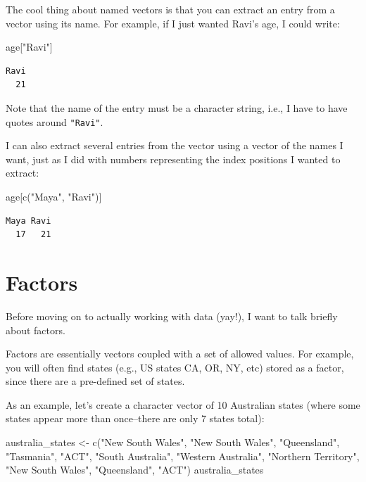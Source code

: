 \documentclass[
  letterpaper,
  DIV=11,
  numbers=noendperiod]{scrreprt}
\newenvironment{Shaded}{\begin{snugshade}}{\end{snugshade}}
\newcommand{\FunctionTok}[1]{\textcolor[rgb]{0.28,0.35,0.67}{#1}}
\newcommand{\NormalTok}[1]{\textcolor[rgb]{0.00,0.23,0.31}{#1}}
\newcommand{\OtherTok}[1]{\textcolor[rgb]{0.00,0.23,0.31}{#1}}
\newcommand{\StringTok}[1]{\textcolor[rgb]{0.13,0.47,0.30}{#1}}
\begin{document}
The cool thing about named vectors is that you can extract an entry from
a vector using its name. For example, if I just wanted Ravi's age, I
could write:

\begin{Shaded}
\begin{Highlighting}[]
\NormalTok{age[}\StringTok{"Ravi"}\NormalTok{]}
\end{Highlighting}
\end{Shaded}

\begin{verbatim}
Ravi 
  21 
\end{verbatim}

Note that the name of the entry must be a character string, i.e., I have
to have quotes around \texttt{"Ravi"}.

I can also extract several entries from the vector using a vector of the
names I want, just as I did with numbers representing the index
positions I wanted to extract:

\begin{Shaded}
\begin{Highlighting}[]
\NormalTok{age[}\FunctionTok{c}\NormalTok{(}\StringTok{"Maya"}\NormalTok{, }\StringTok{"Ravi"}\NormalTok{)]}
\end{Highlighting}
\end{Shaded}

\begin{verbatim}
Maya Ravi 
  17   21 
\end{verbatim}

\section{Factors}\label{factors}

Before moving on to actually working with data (yay!), I want to talk
briefly about factors.

Factors are essentially vectors coupled with a set of allowed values.
For example, you will often find states (e.g., US states CA, OR, NY,
etc) stored as a factor, since there are a pre-defined set of states.

As an example, let's create a character vector of 10 Australian states
(where some states appear more than once--there are only 7 states
total):

\begin{Shaded}
\begin{Highlighting}[]
\NormalTok{australia\_states }\OtherTok{\textless{}{-}} \FunctionTok{c}\NormalTok{(}\StringTok{"New South Wales"}\NormalTok{, }\StringTok{"New South Wales"}\NormalTok{, }\StringTok{"Queensland"}\NormalTok{, }\StringTok{"Tasmania"}\NormalTok{, }\StringTok{"ACT"}\NormalTok{, }\StringTok{"South Australia"}\NormalTok{, }\StringTok{"Western Australia"}\NormalTok{, }\StringTok{"Northern Territory"}\NormalTok{, }\StringTok{"New South Wales"}\NormalTok{, }\StringTok{"Queensland"}\NormalTok{, }\StringTok{"ACT"}\NormalTok{)}
\NormalTok{australia\_states}
\end{Highlighting}
\end{Shaded}
\end{document}
